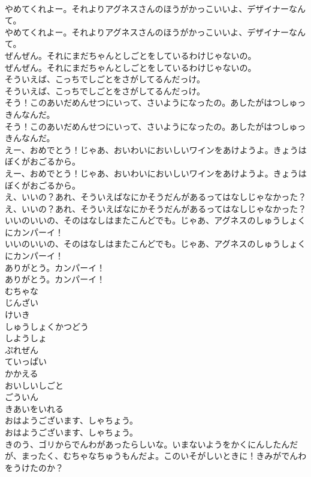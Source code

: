 \documentclass[8pt]{extreport}
\begin{document}
\begin{CJK}{UTF8}{min}
\\	やめてくれよー。それよりアグネスさんのほうがかっこいいよ、デザイナーなんて。	
\\	やめてくれよー。それよりアグネスさんのほうがかっこいいよ、デザイナーなんて。 
\\	ぜんぜん。それにまだちゃんとしごとをしているわけじゃないの。	
\\	ぜんぜん。それにまだちゃんとしごとをしているわけじゃないの。 
\\	そういえば、こっちでしごとをさがしてるんだっけ。	
\\	そういえば、こっちでしごとをさがしてるんだっけ。 
\\	そう！このあいだめんせつにいって、さいようになったの。あしたがはつしゅっきんなんだ。	
\\	そう！このあいだめんせつにいって、さいようになったの。あしたがはつしゅっきんなんだ。 
\\	えー、おめでとう！じゃあ、おいわいにおいしいワインをあけようよ。きょうはぼくがおごるから。	
\\	えー、おめでとう！じゃあ、おいわいにおいしいワインをあけようよ。きょうはぼくがおごるから。 
\\	え、いいの？あれ、そういえばなにかそうだんがあるってはなしじゃなかった？	
\\	え、いいの？あれ、そういえばなにかそうだんがあるってはなしじゃなかった？ 
\\	いいのいいの、そのはなしはまたこんどでも。じゃあ、アグネスのしゅうしょくにカンパーイ！	
\\	いいのいいの、そのはなしはまたこんどでも。じゃあ、アグネスのしゅうしょくにカンパーイ！ 
\\	ありがとう。カンパーイ！	
\\	ありがとう。カンパーイ！ 
\\	むちゃな
\\	じんざい
\\	けいき
\\	しゅうしょくかつどう
\\	しようしょ
\\	ぷれぜん
\\	ていっぱい
\\	かかえる
\\	おいしいしごと
\\	ごういん
\\	きあいをいれる
\\	おはようございます、しゃちょう。	
\\	おはようございます、しゃちょう。 
\\	きのう、ゴリからでんわがあったらしいな。いまないようをかくにんしたんだが、まったく、むちゃなちゅうもんだよ。このいそがしいときに！きみがでんわをうけたのか？	

\end{CJK}
\end{document}
